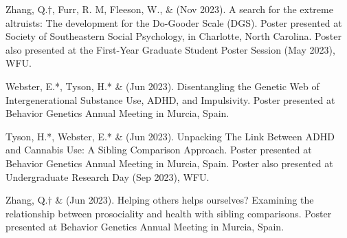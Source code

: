 \begin{etaremune}
\item Zhang, Q.$\dagger$, Furr, R. M, Fleeson, W., \& \meb (Nov 2023). A search for the extreme altruists: The development for the Do-Gooder Scale (DGS). Poster presented at Society of Southeastern Social Psychology, in Charlotte, North Carolina. Poster also presented at the First-Year Graduate Student Poster Session (May 2023), WFU. %


\item Webster, E.*, Tyson, H.* \& \meb (Jun 2023). Disentangling the Genetic Web of Intergenerational Substance Use, ADHD, and Impulsivity. Poster presented at Behavior Genetics Annual Meeting in Murcia, Spain.

\item Tyson, H.*, Webster, E.*  \& \meb (Jun 2023). Unpacking The Link Between ADHD and Cannabis Use: A Sibling Comparison Approach. Poster presented at Behavior Genetics Annual Meeting in Murcia, Spain. Poster also presented at Undergraduate Research Day (Sep 2023), WFU.

\item Zhang, Q.$\dagger$ \& \meb (Jun 2023). Helping others helps ourselves? Examining the relationship between prosociality and health with sibling comparisons. Poster presented at Behavior Genetics Annual Meeting in Murcia, Spain.


\end{etaremune}
